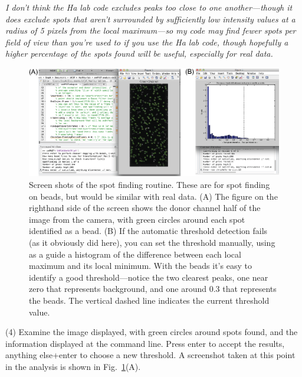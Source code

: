 \documentclass[11pt]{article}
\begin{document}
{\it I don't think the Ha lab code excludes peaks too close to one another---though it does exclude spots that aren't surrounded by sufficiently low intensity values at a radius of 5 pixels from the local maximum---so my code may find fewer spots per field of view than you're used to if you use the Ha lab code, though hopefully a higher percentage of the spots found will be useful, especially for real data.}\\

\begin{figure}
\begin{center}
\includegraphics[width=6.5in]{ScreenShots/BeadFindScreenShot.eps}
\caption{Screen shots of the spot finding routine. These are for spot finding on beads, but would be similar with real data. (A) The figure on the righthand side of the screen shows the donor channel half of the image from the camera, with green circles around each spot identified as a bead. (B) If the automatic threshold detection fails (as it obviously did here), you can set the threshold manually, using as a guide a histogram of the difference between each local maximum and its local minimum.  With the beads it's easy to identify a good threshold---notice the two clearest peaks, one near zero that represents background, and one around 0.3 that represents the beads. The vertical dashed line indicates the current threshold value. }
\label{fig:BeadFindShot}
\end{center}
\end{figure}

\noindent (4) Examine the image displayed, with green circles around spots found, and the information displayed at the command line. Press enter to accept the results, anything else+enter to choose a new threshold.  A screenshot taken at this point in the analysis is shown in Fig.~\ref{fig:BeadFindShot}(A).\\
\end{document}

